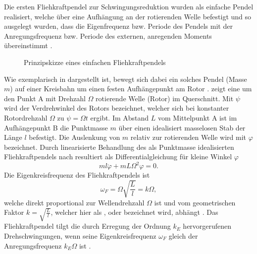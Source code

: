 Die ersten Fliehkraftpendel zur Schwingungsreduktion wurden als einfache Pendel realisiert, 
welche über eine Aufhängung an der rotierenden Welle 
befestigt und so ausgelegt wurden, dass die Eigenfrequenz bzw. Periode des Pendels
mit der Anregungsfrequenz bzw. Periode des externen, anregenden Moments übereinstimmt \cite{Denman:Tautochronic}.
%
%
\begin{figure}[ht]%
	\centering
	
	\caption{Prinzipskizze eines einfachen Fliehkraftpendels}
	\label{fig:Einleitung:PendelMitPunktmasse}
\end{figure}
%
%
Wie exemplarisch in  dargestellt ist, bewegt  sich dabei ein solches
Pendel (Masse $m$) auf einer Kreisbahn um einen festen Aufhängepunkt am Rotor \cite{Denman:Tautochronic}.
  zeigt eine um den Punkt A
 mit Drehzahl $\Omega$ rotierende Welle (Rotor) im Querschnitt.
Mit $\psi$ wird der Verdrehwinkel des Rotors bezeichnet, welcher sich bei konstanter
Rotordrehzahl $\Omega$ zu $\psi = \Omega t$ ergibt.
Im Abstand $L$ vom Mittelpunkt A ist im Aufhängepunkt B die Punktmasse $m$ über einen
idealisiert masselosen Stab der Länge $l$  befestigt.
Die Auslenkung von $m$ relativ zur rotierenden Welle wird mit $\varphi$ bezeichnet.
%
%
%
Durch linearisierte Behandlung des als Punktmasse idealisierten Fliehkraftpendels
nach  resultiert als
Differentialgleichung für kleine Winkel $\varphi$
\begin{equation}
	ml\ddot{\varphi} + m L \Omega^2 \varphi = 0.
\label{eq:Einleitung:DGLLinearisiertesSystem}
\end{equation}
%
%
Die Eigenkreisfrequenz des Fliehkraftpendels ist 
\begin{equation}
	\omega_{F} = \Omega \sqrt{\frac{L}{l}} = k \Omega,
\label{eq:Einleitung:EigenfrequenzFliehkraftpendel}
\end{equation}
welche direkt proportional zur Wellendrehzahl $\Omega$ ist und vom geometrischen Faktor $k=\sqrt{\frac{L}{l}}$,
welcher hier als ,  oder   
bezeichnet wird, abhängt \cite{Schick:1939:WirkungFliehkraftpendel}.
Das Fliehkraftpendel tilgt die durch Erregung der
Ordnung $k_E$ hervorgerufenen Drehschwingungen, wenn
seine Eigenkreisfrequenz $\omega_{F}$ gleich der Anregungsfrequenz $k_E \Omega$ 
ist \cite{Markert:2010:Fahrzeugschwingung, Schick:1939:WirkungFliehkraftpendel}.

